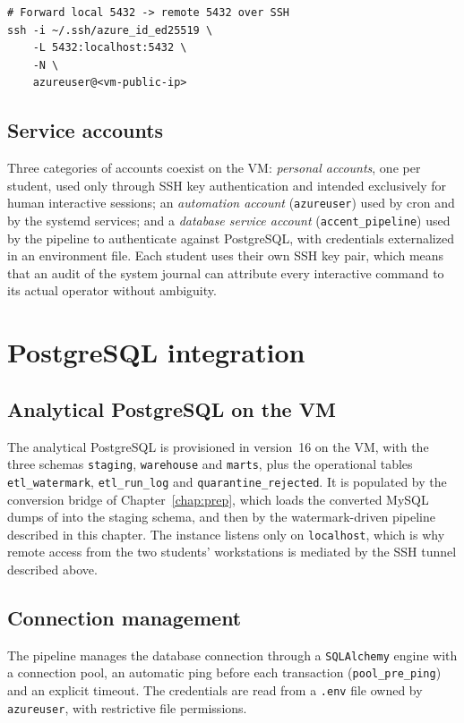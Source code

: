 \begin{lstlisting}[style=bash,caption={Opening an SSH tunnel from a developer workstation to the Azure VM.},label={lst:ssh-tunnel}]
# Forward local 5432 -> remote 5432 over SSH
ssh -i ~/.ssh/azure_id_ed25519 \
    -L 5432:localhost:5432 \
    -N \
    azureuser@<vm-public-ip>
\end{lstlisting}

\subsection{Service accounts}
Three categories of accounts coexist on the VM: \emph{personal accounts}, one per student, used only through SSH key authentication and intended exclusively for human interactive sessions; an \emph{automation account} (\texttt{azureuser}) used by cron and by the systemd services; and a \emph{database service account} (\texttt{accent\_pipeline}) used by the pipeline to authenticate against PostgreSQL, with credentials externalized in an environment file. Each student uses their own SSH key pair, which means that an audit of the system journal can attribute every interactive command to its actual operator without ambiguity.

\section{PostgreSQL integration}

\subsection{Analytical PostgreSQL on the VM}
The analytical PostgreSQL is provisioned in version~16 on the VM, with the three schemas \texttt{staging}, \texttt{warehouse} and \texttt{marts}, plus the operational tables \texttt{etl\_watermark}, \texttt{etl\_run\_log} and \texttt{quarantine\_rejected}. It is populated by the conversion bridge of Chapter~\ref{chap:prep}, which loads the converted MySQL dumps of \hostorg{} into the staging schema, and then by the watermark-driven pipeline described in this chapter. The instance listens only on \texttt{localhost}, which is why remote access from the two students' workstations is mediated by the SSH tunnel described above.

\subsection{Connection management}
The pipeline manages the database connection through a \texttt{SQLAlchemy} engine with a connection pool, an automatic ping before each transaction (\texttt{pool\_pre\_ping}) and an explicit timeout. The credentials are read from a \texttt{.env} file owned by \texttt{azureuser}, with restrictive file permissions.

